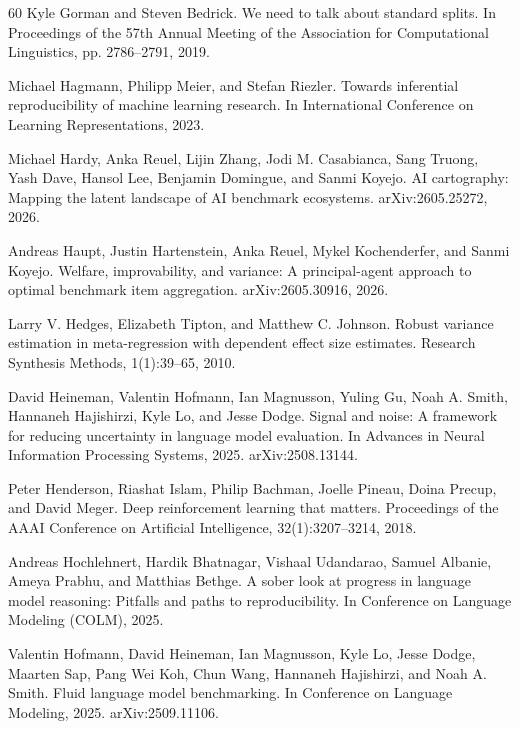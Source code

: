 \begin{thebibliography}{60}
Kyle Gorman and Steven Bedrick. We need to talk about standard splits. In Proceedings of the 57th Annual Meeting of the Association for Computational Linguistics, pp. 2786--2791, 2019.

Michael Hagmann, Philipp Meier, and Stefan Riezler. Towards inferential reproducibility of machine learning research. In International Conference on Learning Representations, 2023.

Michael Hardy, Anka Reuel, Lijin Zhang, Jodi M. Casabianca, Sang Truong, Yash Dave, Hansol Lee, Benjamin Domingue, and Sanmi Koyejo. AI cartography: Mapping the latent landscape of AI benchmark ecosystems. arXiv:2605.25272, 2026.

Andreas Haupt, Justin Hartenstein, Anka Reuel, Mykel Kochenderfer, and Sanmi Koyejo. Welfare, improvability, and variance: A principal-agent approach to optimal benchmark item aggregation. arXiv:2605.30916, 2026.

Larry V. Hedges, Elizabeth Tipton, and Matthew C. Johnson. Robust variance estimation in meta-regression with dependent effect size estimates. Research Synthesis Methods, 1(1):39--65, 2010.

David Heineman, Valentin Hofmann, Ian Magnusson, Yuling Gu, Noah A. Smith, Hannaneh Hajishirzi, Kyle Lo, and Jesse Dodge. Signal and noise: A framework for reducing uncertainty in language model evaluation. In Advances in Neural Information Processing Systems, 2025. arXiv:2508.13144.

Peter Henderson, Riashat Islam, Philip Bachman, Joelle Pineau, Doina Precup, and David Meger. Deep reinforcement learning that matters. Proceedings of the AAAI Conference on Artificial Intelligence, 32(1):3207--3214, 2018.

Andreas Hochlehnert, Hardik Bhatnagar, Vishaal Udandarao, Samuel Albanie, Ameya Prabhu, and Matthias Bethge. A sober look at progress in language model reasoning: Pitfalls and paths to reproducibility. In Conference on Language Modeling (COLM), 2025.

Valentin Hofmann, David Heineman, Ian Magnusson, Kyle Lo, Jesse Dodge, Maarten Sap, Pang Wei Koh, Chun Wang, Hannaneh Hajishirzi, and Noah A. Smith. Fluid language model benchmarking. In Conference on Language Modeling, 2025. arXiv:2509.11106.


\end{thebibliography}
